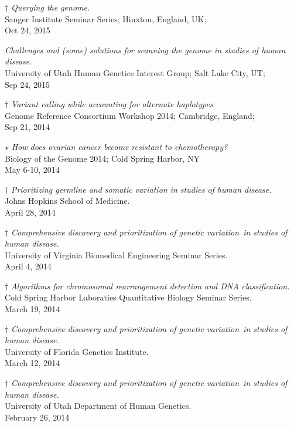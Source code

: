 \documentclass[margin,line]{cv}
\begin{document}
\begin{resume}
    $\dagger$ \textit{Querying the genome.} \\
    Sanger Institute Seminar Series; Hinxton, England, UK; \\
    Oct 24, 2015 

    \textit{Challenges and (some) solutions for scanning the genome in studies of human disease.} \\
    University of Utah Human Genetics Interest Group; Salt Lake City, UT; \\
    Sep 24, 2015

    $\dagger$ \textit{Variant calling while accounting for
    alternate haplotypes} \\
    Genome Reference Consortium Workshop 2014; Cambridge, England; \\
    Sep 21, 2014

    $\star$ \textit{How does ovarian cancer become resistant to chemotherapy?} \\
    Biology of the Genome 2014; Cold Spring Harbor, NY \\
    May 6-10, 2014

    $\dagger$ \textit{Prioritizing germline and somatic variation in studies of human disease.} \\
    Johns Hopkins School of Medicine. \\
    April 28, 2014

    $\dagger$ \textit{Comprehensive discovery and prioritization of genetic variation in studies of human disease.} \\
    University of Virginia Biomedical Engineering Seminar Series. \\
    April 4, 2014

    $\dagger$ \textit{Algorithms for chromosomal rearrangement detection and DNA classification.} \\
    Cold Spring Harbor Laboraties Quantitative Biology Seminar Series. \\
    March 19, 2014

    $\dagger$ \textit{Comprehensive discovery and prioritization of genetic variation in studies of human disease.} \\
    University of Florida Genetics Institute. \\
    March 12, 2014

    $\dagger$ \textit{Comprehensive discovery and prioritization of genetic variation in studies of human disease.} \\
    University of Utah Department of Human Genetics. \\
    February 26, 2014


\end{resume}
\end{document}
